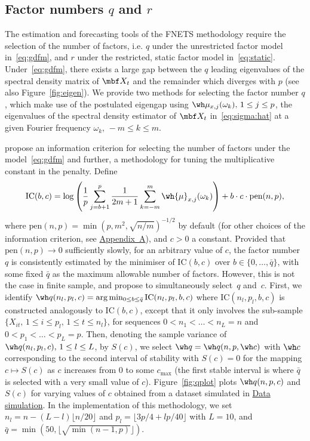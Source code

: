 \subsection{Factor numbers $q$ and $r$}
\label{sec:tuning:factor}

The estimation and forecasting tools of the FNETS methodology require the selection of the number of factors, i.e. $q$ under the unrestricted factor model in~\eqref{eq:gdfm}, and $r$ under the restricted, static factor model in~\eqref{eq:static}.
Under~\eqref{eq:gdfm}, there exists a large gap between the $q$ leading eigenvalues of the spectral density matrix of $\mbf X_t$ and the remainder which diverges with $p$ (see also Figure~\ref{fig:eigen}).
We provide two methods for selecting the factor number $q$, which make use of the postulated eigengap using $\wh\mu_{x, j}(\omega_k), \, 1 \le j \le p$, the eigenvalues of the spectral density estimator of $\mbf X_t$ in~\eqref{eq:sigma:hat} at a given Fourier frequency $\omega_k, \, -m \le k \le m$.

\cite{hallin2007determining} propose an information criterion for selecting the number of factors under the model~\eqref{eq:gdfm} and further, a methodology for tuning the multiplicative constant in the penalty.
Define
\begin{align}
\label{eq:ic}
	\text{IC}(b, c) = \log \left(\frac{1}{p} \sum _{j = b + 1}^p \frac{1}{2m + 1} \sum_{k = -m}^m \wh{\mu}_{x, j}(\omega_k) \right) 
 + b \cdot c \cdot \text{pen}(n, p),
\end{align}
where $\text{pen}(n, p) = \min(p, m^2, \sqrt{n / m})^{-1/2}$ by default (for other choices of the information criterion, see \hyperref[sec:factornumber]{Appendix~A}), and $c > 0$ a constant.
Provided that $\text{pen}(n, p) \to 0$ sufficiently slowly, for an arbitrary value of $c$, the factor number $q$ is consistently estimated by the minimiser of $\text{IC}(b, c)$ over $b \in \{0, \ldots, \bar{q}\}$, with some fixed $\bar{q}$ as the maximum allowable number of factors. 
However, this is not the case in finite sample, and \cite{hallin2007determining} propose to simultaneously select~$q$ and~$c$. 
First, we identify $\wh q(n_l, p_l, c) = \arg\min_{0 \le b \le \bar{q}} \text{IC}(n_l, p_l, b, c)$ where $\text{IC}(n_l, p_l, b, c)$ is constructed analogously to $\text{IC}(b, c)$, except that it only involves the sub-sample $\{X_{it}, \, 1 \le i \le p_l, \, 1 \le t \le n_l\}$, for sequences $0 < n_1 < \ldots < n_L = n$ and $0 < p_1 < \ldots < p_L = p$.
Then, denoting the sample variance of $\wh q(n_l, p_l, c), \, 1 \le l \le L$, by $S(c)$, we select $\wh q = \wh q(n, p, \wh c)$ with $\wh c$ corresponding to the second interval of stability with $S(c) = 0$ for the mapping $c \mapsto S(c)$ as $c$ increases from $0$ to some $c_{\max}$ (the first stable interval is where $\bar{q}$ is selected with a very small value of $c$).
Figure~\ref{fig:qplot} plots $\wh q(n, p, c)$ and $S(c)$ for varying values of $c$ obtained from a dataset simulated in \hyperref[sec:package:data]{Data simulation}. 
In the implementation of this methodology, we set $n_l = n - (L - l) \lfloor n/20 \rfloor$ and $p_l = \lfloor 3p/4 + lp/40 \rfloor$ with $L = 10$, and $\bar{q} = \min(50, \lfloor \sqrt{\min(n - 1, p)} \rfloor)$.

